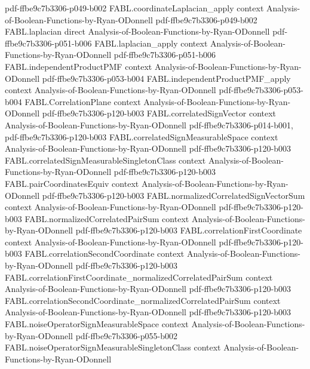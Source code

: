 \begin{theorem}
  {pdf-ffbe9c7b3306-p049-b002}
\proofstep
  {FABL.coordinateLaplacian_apply}
  {context}
  {Analysis-of-Boolean-Functions-by-Ryan-ODonnell}
  {pdf-ffbe9c7b3306-p049-b002}
\proofstep
  {FABL.laplacian}
  {direct}
  {Analysis-of-Boolean-Functions-by-Ryan-ODonnell}
  {pdf-ffbe9c7b3306-p051-b006}
\proofstep
  {FABL.laplacian_apply}
  {context}
  {Analysis-of-Boolean-Functions-by-Ryan-ODonnell}
  {pdf-ffbe9c7b3306-p051-b006}
\proofstep
  {FABL.independentProductPMF}
  {context}
  {Analysis-of-Boolean-Functions-by-Ryan-ODonnell}
  {pdf-ffbe9c7b3306-p053-b004}
\proofstep
  {FABL.independentProductPMF_apply}
  {context}
  {Analysis-of-Boolean-Functions-by-Ryan-ODonnell}
  {pdf-ffbe9c7b3306-p053-b004}
\proofstep
  {FABL.CorrelationPlane}
  {context}
  {Analysis-of-Boolean-Functions-by-Ryan-ODonnell}
  {pdf-ffbe9c7b3306-p120-b003}
\proofstep
  {FABL.correlatedSignVector}
  {context}
  {Analysis-of-Boolean-Functions-by-Ryan-ODonnell}
  {pdf-ffbe9c7b3306-p014-b001,
    pdf-ffbe9c7b3306-p120-b003}
\proofstep
  {FABL.correlatedSignMeasurableSpace}
  {context}
  {Analysis-of-Boolean-Functions-by-Ryan-ODonnell}
  {pdf-ffbe9c7b3306-p120-b003}
\proofstep
  {FABL.correlatedSignMeasurableSingletonClass}
  {context}
  {Analysis-of-Boolean-Functions-by-Ryan-ODonnell}
  {pdf-ffbe9c7b3306-p120-b003}
\proofstep
  {FABL.pairCoordinatesEquiv}
  {context}
  {Analysis-of-Boolean-Functions-by-Ryan-ODonnell}
  {pdf-ffbe9c7b3306-p120-b003}
\proofstep
  {FABL.normalizedCorrelatedSignVectorSum}
  {context}
  {Analysis-of-Boolean-Functions-by-Ryan-ODonnell}
  {pdf-ffbe9c7b3306-p120-b003}
\proofstep
  {FABL.normalizedCorrelatedPairSum}
  {context}
  {Analysis-of-Boolean-Functions-by-Ryan-ODonnell}
  {pdf-ffbe9c7b3306-p120-b003}
\proofstep
  {FABL.correlationFirstCoordinate}
  {context}
  {Analysis-of-Boolean-Functions-by-Ryan-ODonnell}
  {pdf-ffbe9c7b3306-p120-b003}
\proofstep
  {FABL.correlationSecondCoordinate}
  {context}
  {Analysis-of-Boolean-Functions-by-Ryan-ODonnell}
  {pdf-ffbe9c7b3306-p120-b003}
\proofstep
  {FABL.correlationFirstCoordinate_normalizedCorrelatedPairSum}
  {context}
  {Analysis-of-Boolean-Functions-by-Ryan-ODonnell}
  {pdf-ffbe9c7b3306-p120-b003}
\proofstep
  {FABL.correlationSecondCoordinate_normalizedCorrelatedPairSum}
  {context}
  {Analysis-of-Boolean-Functions-by-Ryan-ODonnell}
  {pdf-ffbe9c7b3306-p120-b003}
\proofstep
  {FABL.noiseOperatorSignMeasurableSpace}
  {context}
  {Analysis-of-Boolean-Functions-by-Ryan-ODonnell}
  {pdf-ffbe9c7b3306-p055-b002}
\proofstep
  {FABL.noiseOperatorSignMeasurableSingletonClass}
  {context}
  {Analysis-of-Boolean-Functions-by-Ryan-ODonnell}

\end{theorem}
